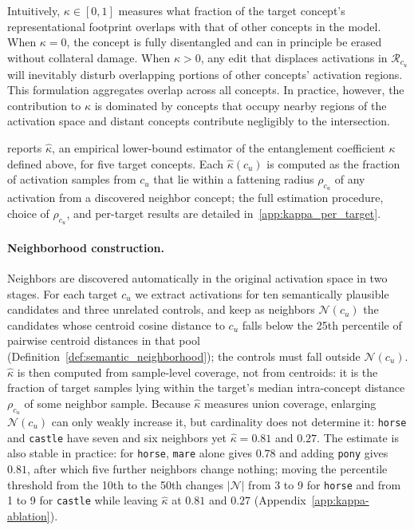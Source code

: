 \noindent Intuitively, $\kappa \in [0,1]$ measures what fraction of the target concept's representational footprint overlaps with that of other concepts in the model. When $\kappa = 0$, the concept is fully disentangled and can in principle be erased without collateral damage. When $\kappa > 0$, any edit that displaces activations in $\mathcal{R}_{c_u}$ will inevitably disturb overlapping portions of other concepts' activation regions.
This formulation aggregates overlap across all concepts. In practice, however, the contribution to $\kappa$ is dominated by concepts that occupy nearby regions of the activation space and distant concepts contribute negligibly to the intersection. 

 reports $\hat\kappa$, an empirical lower-bound estimator of the entanglement coefficient $\kappa$ defined above, for five target concepts.
Each $\hat\kappa(c_u)$ is computed as the fraction of activation samples from $c_u$ that lie within a fattening radius $\rho_{c_u}$ of any activation from a discovered neighbor concept; the full estimation procedure, choice of $\rho_{c_u}$, and per-target results are detailed in~\cref{app:kappa_per_target}.

\paragraph{Neighborhood construction.} Neighbors are discovered automatically in the original activation space in two stages. For each target $c_u$ we extract activations for ten semantically plausible candidates and three unrelated controls, and keep as neighbors $\mathcal{N}(c_u)$ the candidates whose centroid cosine distance to $c_u$ falls below the 25th percentile of pairwise centroid distances in that pool (Definition~\ref{def:semantic_neighborhood}); the controls must fall outside $\mathcal{N}(c_u)$. $\hat\kappa$ is then computed from sample-level coverage, not from centroids: it is the fraction of target samples lying within the target's median intra-concept distance $\rho_{c_u}$ of some neighbor sample. Because $\hat\kappa$ measures union coverage, enlarging $\mathcal{N}(c_u)$ can only weakly increase it, but cardinality does not determine it: \texttt{horse} and \texttt{castle} have seven and six neighbors yet $\hat\kappa=0.81$ and $0.27$. The estimate is also stable in practice: for \texttt{horse}, \texttt{mare} alone gives $0.78$ and adding \texttt{pony} gives $0.81$, after which five further neighbors change nothing; moving the percentile threshold from the 10th to the 50th changes $|\mathcal{N}|$ from 3 to 9 for \texttt{horse} and from 1 to 9 for \texttt{castle} while leaving $\hat\kappa$ at $0.81$ and $0.27$ (Appendix~\ref{app:kappa-ablation}).

